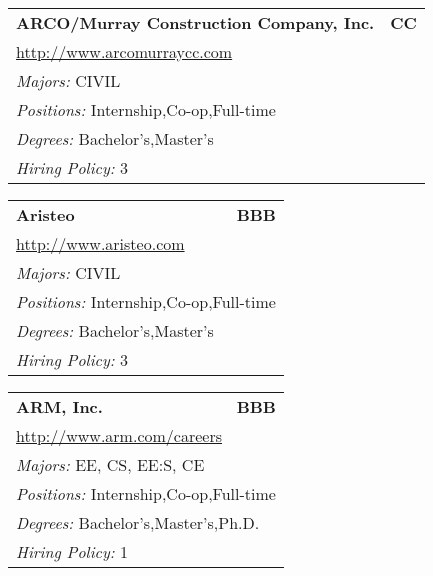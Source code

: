 \documentclass[twoside]{article}
\begin{document}
\begin{center}
\begin{multicols}{3}
\begin{FlushLeft}
\begin{minipage}{\columnwidth}
\end{minipage}
 
\begin{minipage}{\columnwidth}\begin{tabularx}{.95\columnwidth}{Xr}
                 {\Large\bf ARCO/Murray Construction Company, Inc.} & {\Large\bf CC}\\
    \multicolumn{2}{p{.95\columnwidth}}{\url{http://www.arcomurraycc.com}}\\
    \multicolumn{2}{p{.95\columnwidth}}{\emph{Majors:} CIVIL}\\
    \multicolumn{2}{p{.95\columnwidth}}{\emph{Positions:} Internship,Co-op,Full-time}\\
    \multicolumn{2}{p{.95\columnwidth}}{\emph{Degrees:} Bachelor's,Master's}\\
    \multicolumn{2}{p{.95\columnwidth}}{\emph{Hiring Policy:} 3}\\
    \end{tabularx}
    
\end{minipage}
 
\begin{minipage}{\columnwidth}\begin{tabularx}{.95\columnwidth}{Xr}
                 {\Large\bf Aristeo} & {\Large\bf BBB}\\
    \multicolumn{2}{p{.95\columnwidth}}{\url{http://www.aristeo.com}}\\
    \multicolumn{2}{p{.95\columnwidth}}{\emph{Majors:} CIVIL}\\
    \multicolumn{2}{p{.95\columnwidth}}{\emph{Positions:} Internship,Co-op,Full-time}\\
    \multicolumn{2}{p{.95\columnwidth}}{\emph{Degrees:} Bachelor's,Master's}\\
    \multicolumn{2}{p{.95\columnwidth}}{\emph{Hiring Policy:} 3}\\
    \end{tabularx}
    
\end{minipage}
 
\begin{minipage}{\columnwidth}\begin{tabularx}{.95\columnwidth}{Xr}
                 {\Large\bf ARM, Inc.} & {\Large\bf BBB}\\
    \multicolumn{2}{p{.95\columnwidth}}{\url{http://www.arm.com/careers}}\\
    \multicolumn{2}{p{.95\columnwidth}}{\emph{Majors:} EE, CS, EE:S, CE}\\
    \multicolumn{2}{p{.95\columnwidth}}{\emph{Positions:} Internship,Co-op,Full-time}\\
    \multicolumn{2}{p{.95\columnwidth}}{\emph{Degrees:} Bachelor's,Master's,Ph.D.}\\
    \multicolumn{2}{p{.95\columnwidth}}{\emph{Hiring Policy:} 1}\\
    \end{tabularx}
    

\end{minipage}
\end{FlushLeft}
\end{multicols}
\end{center}
\end{document}
